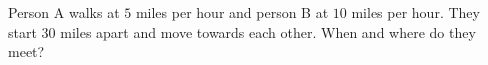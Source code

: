 Person A walks at $5$ miles per hour and person B at $10$ miles per hour. They start $30$ miles apart and move towards each other. When and where do they meet?
